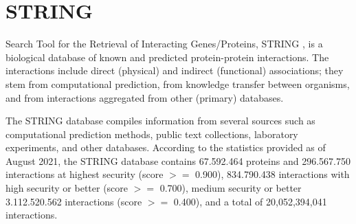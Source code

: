 \section{STRING}
Search Tool for the Retrieval of Interacting Genes/Proteins, STRING \cite{szklarczyk2021string}, is a biological database of known and predicted protein-protein interactions. The interactions include direct (physical) and indirect (functional) associations; they stem from computational prediction, from knowledge transfer between organisms, and from interactions aggregated from other (primary) databases.

The STRING database compiles information from several sources such as computational prediction methods, public text collections, laboratory experiments, and other databases. According to the statistics provided as of August 2021, the STRING database contains 67.592.464 proteins and 296.567.750 interactions at highest security (score $>=$ 0.900),  834.790.438 interactions with high security or better (score $>=$ 0.700), medium security or better 3.112.520.562 interactions (score $>=$ 0.400), and a total of 20,052,394,041 interactions.